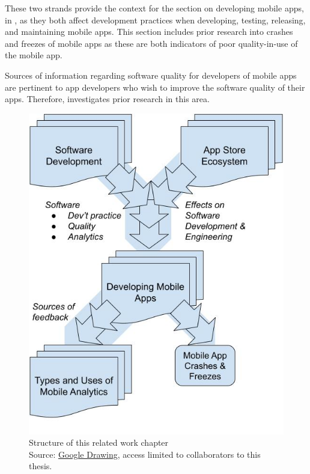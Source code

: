 These two strands provide the context for the section on developing mobile apps, in , as they both affect development practices when developing, testing, releasing, and maintaining mobile apps. This section includes prior research into crashes and freezes of mobile apps as these are both indicators of poor quality-in-use of the mobile app.

Sources of information regarding software quality for developers of mobile apps are pertinent to app developers who wish to improve the software quality of their apps. Therefore,  investigates prior research in this area.


\begin{figure}
    \centering
    \includegraphics[width=\textwidth]{images/my/related-work-chapter-structure-27-jul-2022b.jpeg}
    \caption[Structure of this related work chapter]{Structure of this related work chapter\\ Source: \href{https://docs.google.com/drawings/d/1DosM__BfTGqoIYkkkltbyDreCT5wYC1Z0mR9i1ZSxWc/edit?usp=sharing}{Google Drawing}, access limited to collaborators to this thesis.}
    \label{fig:related-work-chapter-structure}
\end{figure}

